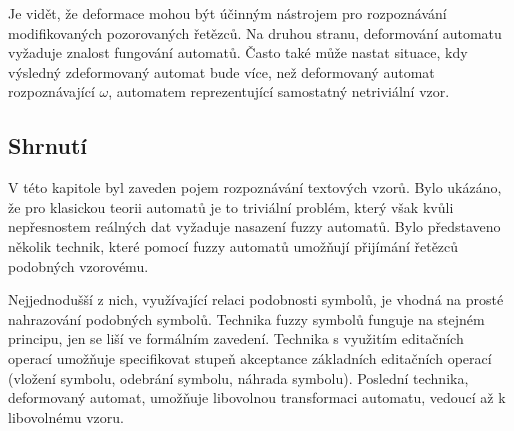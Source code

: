 \documentclass[a4paper,10pt]{article}
\begin{document}
Je vidět, že deformace mohou být účinným nástrojem pro rozpoznávání modifikovaných pozorovaných řetězců. Na druhou stranu, deformování automatu vyžaduje znalost fungování automatů. Často také může nastat situace, kdy výsledný zdeformovaný automat bude více, než deformovaný automat rozpoznávající $\omega$, automatem reprezentující samostatný netriviální vzor.

\subsection{Shrnutí}
V této kapitole byl zaveden pojem rozpoznávání textových vzorů. Bylo ukázáno, že pro klasickou teorii automatů je to triviální problém, který však kvůli nepřesnostem reálných dat vyžaduje nasazení fuzzy automatů. Bylo představeno několik technik, které pomocí fuzzy automatů umožňují přijímání řetězců podobných vzorovému. 

Nejjednodušší z nich, využívající relaci podobnosti symbolů, je vhodná na prosté nahrazování podobných symbolů. Technika fuzzy symbolů funguje na stejném principu, jen se liší ve formálním zavedení. Technika s využitím editačních operací umožňuje specifikovat stupeň akceptance základních editačních operací (vložení symbolu, odebrání symbolu, náhrada symbolu). Poslední technika, deformovaný automat, umožňuje libovolnou transformaci automatu, vedoucí až k libovolnému vzoru.


\newpage


\end{document}
